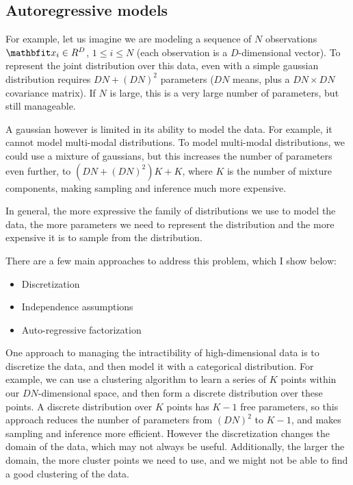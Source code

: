 \subsection{Autoregressive models}

For example, let us imagine we are modeling a sequence of $N$ observations $\x_i \in \R^D$, $1 ≤ i ≤ N$ (each observation is a $D$-dimensional vector). To represent the joint distribution over this data, even with a simple gaussian distribution requires $DN + (DN)^2$ parameters ($DN$ means, plus a $DN \times DN$ covariance matrix). If $N$ is large, this is a very large number of parameters, but still manageable.

A gaussian however is limited in its ability to model the data. For example, it cannot model multi-modal distributions. To model multi-modal distributions, we could use a mixture of gaussians, but this increases the number of parameters even further, to $(DN + (DN)^2)K + K$, where $K$ is the number of mixture components, making sampling and inference much more expensive.

In general, the more expressive the family of distributions we use to model the data, the more parameters we need to represent the distribution and the more expensive it is to sample from the distribution.

There are a few main approaches to address this problem, which I show below:

\begin{itemize}
    \item Discretization
    \item Independence assumptions
    \item Auto-regressive factorization
\end{itemize}

One approach to managing the intractibility of high-dimensional data is to discretize the data, and then model it with a categorical distribution. For example, we can use a clustering algorithm to learn a series of $K$ points within our $DN$-dimensional space, and then form a discrete distribution over these points. A discrete distribution over $K$ points has $K-1$ free parameters, so this approach reduces the number of parameters from $(DN)^2$ to $K-1$, and makes sampling and inference more efficient. However the discretization changes the domain of the data, which may not always be useful. Additionally, the larger the domain, the more cluster points we need to use, and we might not be able to find a good clustering of the data.

